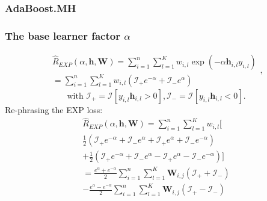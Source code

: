 \documentclass{beamer}
\begin{document}
\begin{frame}
\frametitle{AdaBoost.MH}
\begin{algorithm}[H]
\end{algorithm}
\end{frame}

\begin{frame}
\frametitle{The base learner factor $\alpha$}
$$\begin{array}{c}
\hat{R}_{EXP}(\alpha, \mathbf{h}, \mathbf{W}) = \sum_{i=1}^{n} \sum_{l=1}^{K} w_{i,l} \exp(-\alpha \mathbf{h}_{i,l} y_{i,l}) \\
 = \sum_{i=1}^{n} \sum_{l=1}^{K} w_{i,l}(\mathcal{I}_+ e^{-\alpha} + \mathcal{I}_- e^{\alpha})
 \end{array},$$
$$\text{with } \mathcal{I}_+ = \mathcal{I}[y_{i,l} \mathbf{h}_{i,l} > 0], \mathcal{I}_- = \mathcal{I}[y_{i,l} \mathbf{h}_{i,l} < 0]. $$
\pause
Re-phrasing the EXP loss:
$$\begin{array}{c}
\hat{R}_{EXP}(\alpha, \mathbf{h}, \mathbf{W}) = \sum_{i=1}^{n} \sum_{l=1}^{K} w_{i,l}[ \\
  \frac{1}{2}(\mathcal{I}_+ e^{-\alpha} +\mathcal{I}_- e^{\alpha} + \mathcal{I}_+ e^{\alpha} + \mathcal{I}_- e^{-\alpha}) \\
  + \frac{1}{2}(\mathcal{I}_+ e^{-\alpha} + \mathcal{I}_- e^{\alpha} - \mathcal{I}_+ e^{\alpha} - \mathcal{I}_- e^{-\alpha})] \\
= \frac{e^\alpha + e^{-\alpha}}{2}\sum_{i=1}^{n} \sum_{l=1}^{K}\mathbf{W}_{i,j}(\mathcal{I}_+ + \mathcal{I}_-) \\
  - \frac{e^\alpha - e^{-\alpha}}{2}\sum_{i=1}^{n}\sum_{l=1}^{K}\mathbf{W}_{i,j}(\mathcal{I}_+ - \mathcal{I}_-) 
 \end{array} $$
\end{frame}
\end{document}

